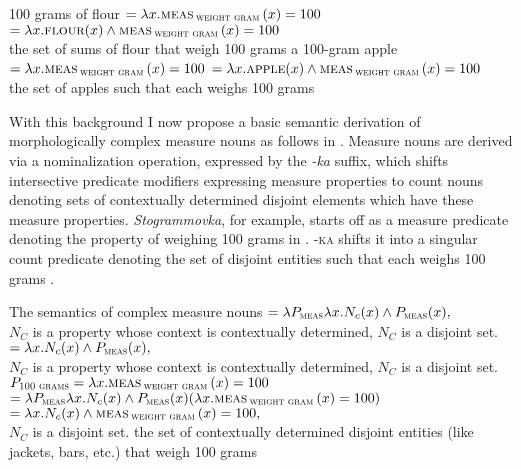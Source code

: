 \documentclass[output=paper]{langscibook}
\begin{document}

\ea\label{ex:khrizmann:15} 100 grams of flour
    \ea\label{ex:khrizmann:15a}  $= \lambda x. \textsc{meas}\,\textsubscript{\textsc{weight gram}}\,(x)= 100$
    \ex\label{ex:khrizmann:15b}  $= \lambda x. \textsc{flour}(x) \wedge \textsc{meas}\,\textsubscript{\textsc{weight gram}}\,(x) = 100$\\
    {the set of sums of flour that weigh 100 grams}
    \z
\ex\label{ex:khrizmann:16} a 100-gram apple
    \ea\label{ex:khrizmann:16a}  $= \lambda x. \textsc{meas}\, \textsubscript{\textsc{weight gram}}\,(x) = 100$
    \ex\label{ex:khrizmann:16b}  $= \lambda x. \textsc{apple}(x) \wedge \textsc{meas}\,\textsubscript{\textsc{weight gram}}\,(x) = 100$\\
    {the set of apples such that each weighs 100 grams}
    \z
\z

\noindent With this background I now propose a basic semantic derivation of morphologically complex measure nouns as follows in . Measure nouns are derived via a nominalization operation, expressed by the \textit{-ka} suffix, which shifts intersective predicate modifiers expressing measure properties to count nouns denoting sets of contextually determined disjoint elements which have these measure properties. \textit{Stogrammovka}, for example, starts off as a measure predicate denoting the property of weighing 100 grams in . \textsc{-ka} shifts it into a singular count predicate denoting the set of disjoint entities such that each weighs 100 grams .

\ea\label{ex:khrizmann:17} The semantics of complex measure nouns
    \ea\label{ex:khrizmann:17a}  $= \lambda P_{\textsc{meas}} \lambda x.N_{c}(x) \wedge P_{\textsc{meas}}(x),$\\
    {$N_C$ is a property whose context is contextually determined, $N_C$ is a disjoint set.}
    \ex\label{ex:khrizmann:17b}  $= \lambda x. N_{c}(x) \wedge P_{\textsc{meas}}(x),$\\
    {$N_C$ is a property whose context is contextually determined, $N_C$ is a disjoint set.}
\z\ex\label{ex:khrizmann:18}
    \ea\label{ex:khrizmann:18a} $P_{\textsc{100 grams}} = \lambda x. \textsc{meas}\,_{\textsc{weight gram}}\,(x) = 100$
    \ex\label{ex:khrizmann:18b}  $= \lambda P_{\textsc{meas}} \lambda x.N_{c}(x) \wedge P_{\textsc{meas}}(x) (\lambda x.\textsc{meas}\,_{\textsc{weight gram}}\,(x) = 100)$\\
            $= \lambda x.N_{c}(x) \wedge \textsc{meas}\,_{\textsc{weight gram}}\,(x) = 100,$\\
            \hspace{.7em} {$N_C$ is a disjoint set.}
    \z
    {the set of contextually determined disjoint entities (like jackets, bars, etc.) that weigh 100 grams}
\z
\end{document}
